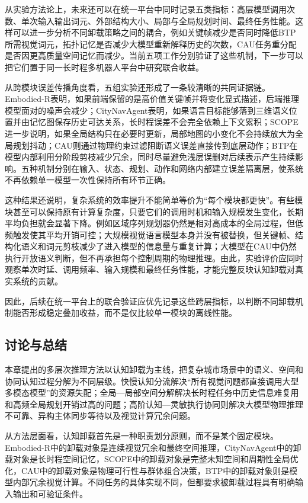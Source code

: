 从实验方法论上，未来还可以在统一平台中同时记录五类指标：高层模型调用次数、单次输入输出词元、外部结构大小、局部与全局规划时间、最终任务性能。这样可以进一步分析不同卸载策略之间的耦合，例如关键帧减少是否同时降低BTP所需视觉词元，拓扑记忆是否减少大模型重新解释历史的次数，CAU任务重分配是否因更高质量空间记忆而减少。当前五项工作分别验证了这些机制，下一步可以把它们置于同一长时程多机器人平台中研究联合收益。



从跨模块误差传播角度看，五组实验还形成了一条较清晰的共同证据链。Embodied-R表明，如果前端保留的是高价值关键帧并将变化显式描述，后端推理模型面对的噪声会减少；CityNavAgent表明，如果语言目标能够落到三维语义位置并由记忆图保存历史可达关系，长时程误差不会完全依赖上下文累积；SCOPE进一步说明，如果全局结构只在必要时更新，局部地图的小变化不会持续放大为全局规划抖动；CAU则通过物理约束过滤阻断语义误差直接传到底层动作；BTP在模型内部利用分阶段剪枝减少冗余，同时尽量避免浅层误删对后续表示产生持续影响。五种机制分别在输入、状态、规划、动作和网络内部建立误差隔离层，使系统不再依赖单一模型一次性保持所有环节正确。

这种结果还说明，复杂系统的效率提升不能简单等价为“每个模块都更快”。有些模块甚至可以保持原有计算复杂度，只要它们的调用时机和输入规模发生变化，长期平均负担就会显著下降。例如区域序列规划器仍然是相对高成本的全局过程，但低频触发使其平均开销可控；大规模视觉语言模型本身并没有被替换，但关键帧、结构化语义和词元剪枝减少了进入模型的信息量与重复计算；大模型在CAU中仍然执行开放语义判断，但不再承担每个控制周期的物理推理。由此，实验评价应同时观察单次时延、调用频率、输入规模和最终任务性能，才能完整反映认知卸载对真实系统的贡献。

因此，后续在统一平台上的联合验证应优先记录这些跨层指标，以判断不同卸载机制能否形成稳定叠加收益，而不是仅比较单一模块的离线性能。

\subsection{讨论与总结}
本章提出的多层次推理方法以认知卸载为主线，把复杂城市场景中的语义、空间和协同认知过程分解为不同层级。快慢认知分流解决“所有视觉问题都直接调用大型多模态模型”的资源失配；全局—局部空间分解解决长时程任务中历史信息难复用和高频全局规划开销过高的问题；高阶认知—灵敏执行协同则解决大模型物理推理不可靠、异构主体同步等待以及视觉计算冗余问题。

从方法层面看，认知卸载首先是一种职责划分原则，而不是某个固定模块。Embodied-R中的卸载对象是连续视觉冗余和最终空间推理，CityNavAgent中的卸载对象是长时程空间记忆，SCOPE中的卸载对象是完整未知空间和周期性全局优化，CAU中的卸载对象是物理可行性与群体组合决策，BTP中的卸载对象则是模型内部冗余视觉计算。不同任务的具体实现不同，但都要求被卸载过程具有明确输入输出和可验证条件。

